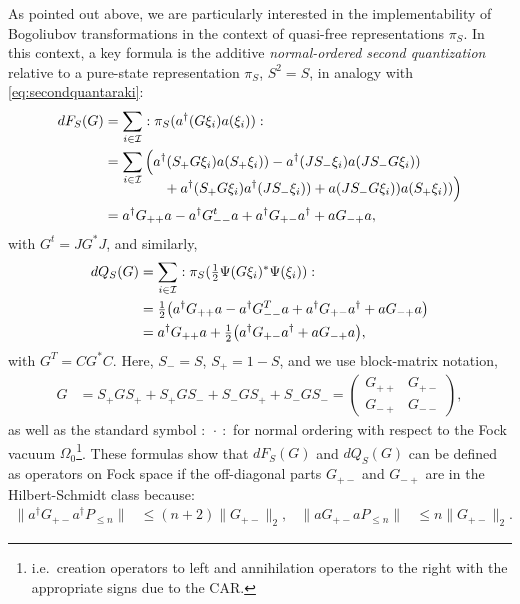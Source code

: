 \documentclass[a4paper, 11pt]{article}
\DeclareMathOperator{\1}{\mathds{1}}
\begin{document}
As pointed out above, we are particularly interested in the implementability of Bogoliubov transformations in the context of quasi-free representations $\pi_{S}$. In this context, a key formula is the additive \textit{normal-ordered second quantization} relative to a pure-state representation $\pi_{S}$, $S^{2}=S$, in analogy with \eqref{eq:secondquantaraki}:
\begin{align}
\label{eq:secondquantarakino}
dF_{S}(G) & = \sum_{i\in\cI}:\pi_{S}(a^{\dag}(G\xi_{i})a(\xi_{i})): \\ \nonumber
 & = \sum_{i\in\cI}\Big(a^{\dag}(S_{+}G\xi_{i})a(S_{+}\xi_{i})) - a^{\dag}(JS_{-}\xi_{i})a(JS_{-}G\xi_{i})) \\[-0.35cm] \nonumber
 &\hspace{1.5cm} + a^{\dag}(S_{+}G\xi_{i})a^{\dag}(JS_{-}\xi_{i}))+a(JS_{-}G\xi_{i}))a(S_{+}\xi_{i}))\Big) \\ \nonumber
 & = a^{\dag}G_{++}a - a^{\dag}G^{t}_{--}a + a^{\dag}G_{+-}a^{\dag}+aG_{-+}a,
\end{align}
with $G^{t} = JG^{*}J$, and similarly,
\begin{align}
\label{eq:secondquantarakinosdc}
dQ_{S}(G) & = \sum_{i\in\cI}:\pi_{S}(\tfrac{1}{2}\Psi(G\xi_{i})^{*}\Psi(\xi_{i})): \\ \nonumber
 & = \tfrac{1}{2}\big(a^{\dag}G_{++}a - a^{\dag}G^{T}_{--}a + a^{\dag}G_{+-}a^{\dag}+aG_{-+}a\big) \\ \nonumber
 & = a^{\dag}G_{++}a + \tfrac{1}{2}\big(a^{\dag}G_{+-}a^{\dag}+aG_{-+}a\big),
\end{align}
with $G^{T} = CG^{*}C$. Here, $S_{-} = S$, $S_{+}=1-S$, and we use block-matrix notation,
\begin{align}
\label{eq:blockmatrix}
G & = S_{+}GS_{+} + S_{+}GS_{-} + S_{-}GS_{+} + S_{-}GS_{-} = \begin{pmatrix} G_{++} & G_{+-} \\ G_{-+} & G_{--} \end{pmatrix},
\end{align}
as well as the standard symbol $:\!\ \cdot\!\ :$ for normal ordering with respect to the Fock vacuum $\Omega_{0}$\footnote{i.e.~creation operators to left and annihilation operators to the right with the appropriate signs due to the CAR.}. These formulas show that $dF_{S}(G)$ and $dQ_{S}(G) $ can be defined as operators on Fock space if the off-diagonal parts $G_{+-}$ and $G_{-+}$ are in the Hilbert-Schmidt class because:
\begin{align}
\label{eq:hilbertschmidt}
\|a^{\dag}G_{+-}a^{\dag}P_{\leq n}\| & \leq (n+2)\|G_{+-}\|_{2}, & \|aG_{+-}aP_{\leq n}\| & \leq n \|G_{+-}\|_{2}.
\end{align}
\end{document}
